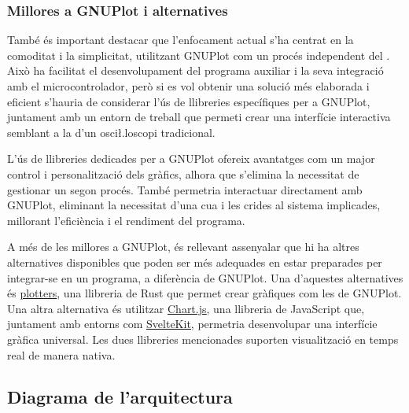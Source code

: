 \documentclass{tfgitic}[2023/06/30]
\begin{document}
\subsubsection{Millores a GNUPlot i alternatives}

També és important destacar que l'enfocament actual s'ha centrat en la
comoditat i la simplicitat, utilitzant GNUPlot com un procés
independent del . Això ha facilitat el desenvolupament
del programa auxiliar i la seva integració amb el microcontrolador,
però si es vol obtenir una solució més elaborada i eficient s'hauria
de considerar l'ús de llibreries específiques per a GNUPlot, juntament
amb un entorn de treball que permeti crear una interfície interactiva
semblant a la d'un osci\l.loscopi tradicional.

L'ús de llibreries dedicades per a GNUPlot ofereix avantatges com un
major control i personalització dels gràfics, alhora que s'elimina la
necessitat de gestionar un segon procés. També permetria interactuar
directament amb GNUPlot, eliminant la necessitat d'una cua i les
crides al sistema implicades, millorant l'eficiència i el rendiment
del programa.

A més de les millores a GNUPlot, és rellevant assenyalar que hi ha
altres alternatives disponibles que poden ser més adequades en estar
preparades per integrar-se en un programa, a diferència de
GNUPlot. Una d'aquestes alternatives és
\href{https://docs.rs/plotters/latest/plotters}{\underline{plotters}},
una llibreria de Rust que permet crear gràfiques com les de
GNUPlot. Una altra alternativa és utilitzar
\href{https://www.chartjs.org/}{\underline{Chart.js}}, una llibreria
de JavaScript que, juntament amb entorns com
\href{https://kit.svelte.dev/}{\underline{SvelteKit}}, permetria
desenvolupar una interfície gràfica universal. Les dues llibreries
mencionades suporten visualització en temps real de manera nativa.

\subsection{Diagrama de l'arquitectura}
\end{document}
